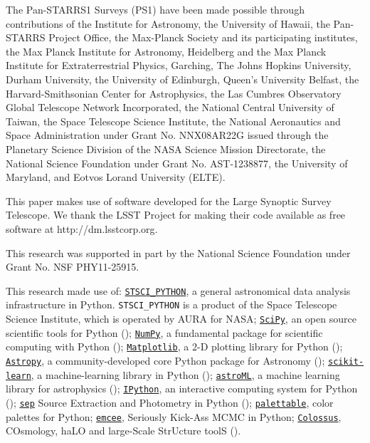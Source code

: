 \documentclass[a4paper,fleqn,usenatbib]{mnras}
\begin{document}
  The Pan-STARRS1 Surveys (PS1) have been made possible through contributions of the 
  Institute for Astronomy, the University of Hawaii, the Pan-STARRS Project Office, 
  the Max-Planck Society and its participating institutes, the Max Planck Institute 
  for Astronomy, Heidelberg and the Max Planck Institute for Extraterrestrial Physics, 
  Garching, The Johns Hopkins University, Durham University, the University of Edinburgh, 
  Queen's University Belfast, the Harvard-Smithsonian Center for Astrophysics, the Las 
  Cumbres Observatory Global Telescope Network Incorporated, the National Central 
  University of Taiwan, the Space Telescope Science Institute, the National Aeronautics 
  and Space Administration under Grant No. NNX08AR22G issued through the Planetary 
  Science Division of the NASA Science Mission Directorate, the National Science 
  Foundation under Grant No. AST-1238877, the University of Maryland, and Eotvos 
  Lorand University (ELTE).
  
  This paper makes use of software developed for the Large Synoptic Survey 
  Telescope. We thank the LSST Project for making their code available as free 
  software at http://dm.lsstcorp.org.
  
  This research was supported in part by the National Science Foundation under Grant 
  No. NSF PHY11-25915. 
 
  This research made use of:
  \href{http://www.stsci.edu/institute/software_hardware/pyraf/stsci\_python}{\texttt{STSCI\_PYTHON}},
      a general astronomical data analysis infrastructure in Python. 
      \texttt{STSCI\_PYTHON} is a product of the Space Telescope Science Institute, 
      which is operated by AURA for NASA;
  \href{http://www.scipy.org/}{\texttt{SciPy}},
      an open source scientific tools for Python (\citealt{SciPy});
  \href{http://www.numpy.org/}{\texttt{NumPy}}, 
      a fundamental package for scientific computing with Python (\citealt{NumPy});
  \href{http://matplotlib.org/}{\texttt{Matplotlib}}, 
      a 2-D plotting library for Python (\citealt{Matplotlib});
  \href{http://www.astropy.org/}{\texttt{Astropy}}, a community-developed 
      core Python package for Astronomy (\citealt{AstroPy}); 
  \href{http://scikit-learn.org/stable/index.html}{\texttt{scikit-learn}},
      a machine-learning library in Python (\citealt{scikit-learn}); 
  \href{http://www.astroml.org/}{\texttt{astroML}}, 
      a machine learning library for astrophysics (\citealt{astroML});
  \href{https://ipython.org}{\texttt{IPython}}, 
      an interactive computing system for Python (\citealt{IPython});
  \href{https://github.com/kbarbary/sep}{\texttt{sep}} 
      Source Extraction and Photometry in Python (\citealt{PythonSEP});
  \href{https://jiffyclub.github.io/palettable/}{\texttt{palettable}},
      color palettes for Python;
  \href{http://dan.iel.fm/emcee/current/}{\texttt{emcee}}, 
      Seriously Kick-Ass MCMC in Python;
  \href{http://bdiemer.bitbucket.org/}{\texttt{Colossus}}, 
      COsmology, haLO and large-Scale StrUcture toolS (\citealt{Colossus}).
\end{document}
